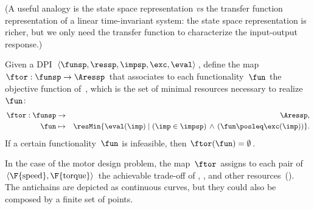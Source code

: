 (A useful analogy is the state space representation \emph{vs} the
transfer function representation of a linear time-invariant system:
the state space representation is richer, but we only need the transfer
function to characterize the input-output response.)
\begin{defn}
\label{def:ftor}Given a DPI $\left\langle \funsp,\ressp,\impsp,\exc,\eval\right\rangle $,
define the map~$\ftor:\funsp\rightarrow\Aressp$ that associates
to each functionality~$\fun$ the objective function of~,
which is the set of minimal resources necessary to realize~$\fun$:
\begin{eqnarray*}
\ftor:\funsp & \rightarrow & \Aressp,\\
\fun & \mapsto & \resMin\{\eval(\imp)\mid\left(\imp\in\impsp\right)\,\wedge\,\left(\fun\posleq\exc(\imp)\right)\}.
\end{eqnarray*}
If a certain functionality~$\fun$ is infeasible, then $\ftor(\fun)=\emptyset$.
\end{defn}

\begin{example}
In the case of the motor design problem, the map~$\ftor$ assigns
to each pair of $\left\langle \F{\text{speed}},\F{\text{torque}}\right\rangle $
the achievable trade-off of , , and other resources~().
The antichains are depicted as continuous curves, but they could also
be composed by a finite set of points.

\end{example}

